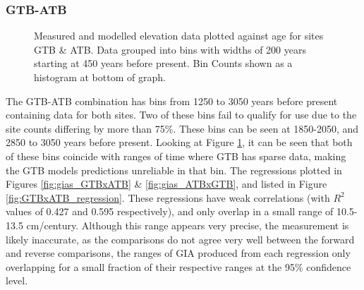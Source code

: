 \subsubsection{GTB-ATB}

\begin{figure}[H]
	\caption{Measured and modelled elevation data plotted against age for sites GTB \& ATB. Data grouped into bins with widths of 200 years starting at 450 years before present. Bin Counts shown as a histogram at bottom of graph.}	
	\label{fig:data_GTBxATB}
\end{figure}

The GTB-ATB combination has
bins from 1250 to 3050 years before present containing data for both sites. Two of these bins
fail to qualify for use due to the site counts differing by more
than 75\%. These bins can be seen at 1850-2050, and 2850 to 3050 years before present. Looking
at Figure \ref{fig:data_GTBxATB}, it can be seen that both of these bins coincide with ranges of
time where GTB has sparse data, making the GTB models predictions unreliable in that bin.
The regressions plotted in Figures \ref{fig:gias_GTBxATB} \& \ref{fig:gias_ATBxGTB}, and
listed in Figure \ref{fig:GTBxATB_regression}. These regressions have weak correlations
(with $R^2$ values of 0.427 and 0.595 respectively), and only overlap in a small
range of 10.5-13.5 cm/century. Although this range appears very precise, the measurement
is likely inaccurate, as the comparisons do not agree very well between the forward
and reverse comparisons, the ranges of GIA produced from each regression only
overlapping for a small fraction of their respective ranges at the 95\% confidence
level.\\

